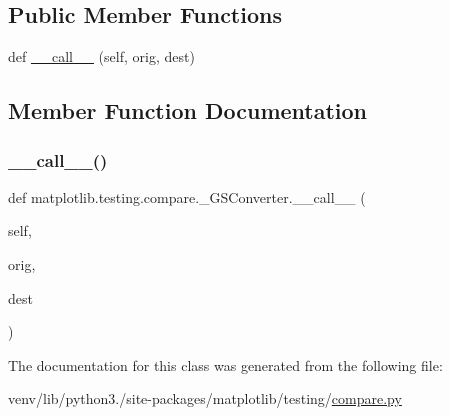 \subsection*{Public Member Functions}
\begin{DoxyCompactItemize}
\item 
def \hyperlink{classmatplotlib_1_1testing_1_1compare_1_1__GSConverter_a0ae3655f4e1a3e3fefc89d4b50094e0b}{\+\_\+\+\_\+call\+\_\+\+\_\+} (self, orig, dest)
\end{DoxyCompactItemize}


\subsection{Member Function Documentation}
\mbox{\label{classmatplotlib_1_1testing_1_1compare_1_1__GSConverter_a0ae3655f4e1a3e3fefc89d4b50094e0b}} 
\subsubsection{\texorpdfstring{\+\_\+\+\_\+call\+\_\+\+\_\+()}{\_\_call\_\_()}}
{\footnotesize\ttfamily def matplotlib.\+testing.\+compare.\+\_\+\+G\+S\+Converter.\+\_\+\+\_\+call\+\_\+\+\_\+ (\begin{DoxyParamCaption}\item[{}]{self,  }\item[{}]{orig,  }\item[{}]{dest }\end{DoxyParamCaption})}



The documentation for this class was generated from the following file\+:\begin{DoxyCompactItemize}
\item 
venv/lib/python3./site-\/packages/matplotlib/testing/\hyperlink{compare_8py}{compare.\+py}\end{DoxyCompactItemize}
